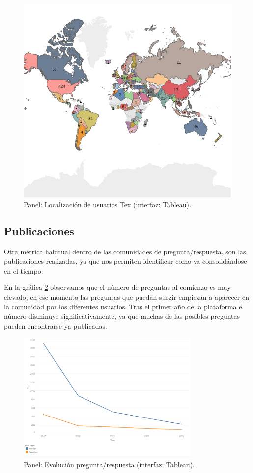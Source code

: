 \documentclass[a4paper, 12pt]{book}
\begin{document}
\begin{figure}[ht]
    \centering
    \includegraphics[width=\textwidth]{img/cse/Maps_cse.png}
    \caption{Panel: Localización de usuarios Tex (interfaz: Tableau).}
    \label{figura:MAP_users_cse}
\end{figure}


\subsection{Publicaciones}
Otra métrica habitual dentro de las comunidades de pregunta/respuesta, son las publicaciones realizadas, ya que nos permiten identificar como va consolidándose en el tiempo. 

En la gráfica \ref{figura:evo_post_anual} observamos que el número de preguntas al comienzo es muy elevado, en ese momento las preguntas que puedan surgir empiezan a aparecer en la comunidad por los diferentes usuarios. Tras el primer año de la plataforma el número disminuye significativamente, ya que muchas de las posibles preguntas pueden encontrarse ya publicadas. 

\begin{figure}[ht]
    \centering
    \includegraphics[width=0.8\textwidth]{img/cse/evo_posts_anual.png}
    \caption{Panel: Evolución pregunta/respuesta (interfaz: Tableau).}
    \label{figura:evo_post_anual}
\end{figure}
\end{document}
